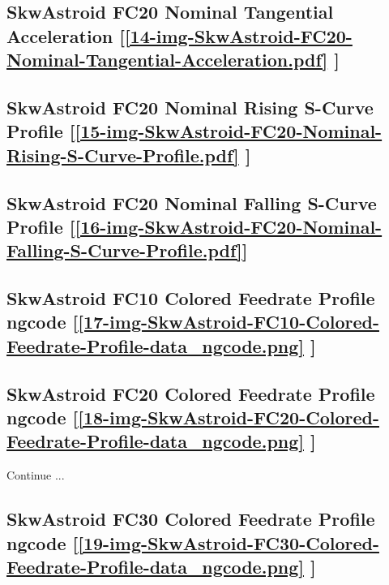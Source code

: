 \subsection     {SkwAstroid FC20 Nominal Tangential Acceleration
	[\ref      {14-img-SkwAstroid-FC20-Nominal-Tangential-Acceleration.pdf} ] }
\label{ssec-14-img-SkwAstroid-FC20-Nominal-Tangential-Acceleration.pdf}

\subsection     {SkwAstroid FC20 Nominal Rising S-Curve Profile
	[\ref      {15-img-SkwAstroid-FC20-Nominal-Rising-S-Curve-Profile.pdf} ] }
\label{ssec-15-img-SkwAstroid-FC20-Nominal-Rising-S-Curve-Profile.pdf}

\subsection     {SkwAstroid FC20 Nominal Falling S-Curve Profile
	[\ref      {16-img-SkwAstroid-FC20-Nominal-Falling-S-Curve-Profile.pdf}] }
\label{ssec-16-img-SkwAstroid-FC20-Nominal-Falling-S-Curve-Profile.pdf}

\subsection       {SkwAstroid FC10 Colored Feedrate Profile ngcode
	[\ref      {17-img-SkwAstroid-FC10-Colored-Feedrate-Profile-data_ngcode.png} ] }
\label{ssec-17-img-SkwAstroid-FC10-Colored-Feedrate-Profile-data_ngcode.png}

\subsection       {SkwAstroid FC20 Colored Feedrate Profile ngcode
	[\ref      {18-img-SkwAstroid-FC20-Colored-Feedrate-Profile-data_ngcode.png} ] }
\label{ssec-18-img-SkwAstroid-FC20-Colored-Feedrate-Profile-data_ngcode.png}

Continue ...\\

\subsection       {SkwAstroid FC30 Colored Feedrate Profile ngcode
	[\ref      {19-img-SkwAstroid-FC30-Colored-Feedrate-Profile-data_ngcode.png} ] }
\label{ssec-19-img-SkwAstroid-FC30-Colored-Feedrate-Profile-data_ngcode.png}

